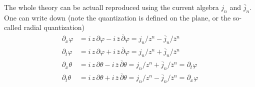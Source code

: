 The whole theory can be actuall reproduced using the current algebra $j_n$ and $\bar{j}_n$. One can write down (note the quantization is defined on the plane, or the so-called radial quantization)
\begin{equation}
	\begin{aligned}
		\partial_x \varphi &= i\,z\,\partial \varphi - i\,\bar{z}\,\overline{\partial}{\varphi}= j_n/z^n -\overline{j}_n / \overline{z}^n \\
		\partial_t \varphi &= i\,z\,\partial \varphi + i\,\bar{z}\,\overline{\partial} \varphi = j_n/z^n + \overline{j}_n / \overline{z}^n \\
		\partial_x \theta &= i\,z\,\partial \theta - i\,\bar{z}\,\overline{\partial}{\theta}= j_n/z^n +\overline{j}_n / \overline{z}^n = \partial_t \varphi\\
		\partial_t \theta &= i\,z\,\partial \theta + i\,\bar{z}\,\overline{\partial}{\theta}= j_n/z^n - \overline{j}_n / \overline{z}^n = \partial_x \varphi
	\end{aligned}
\end{equation}

